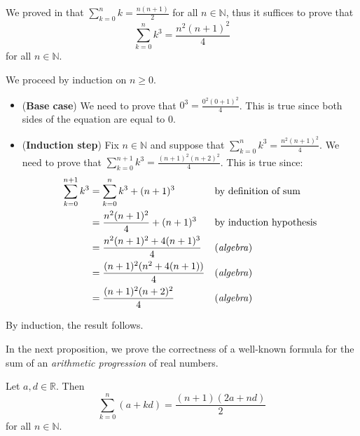 \begin{cproof}
We proved in  that $\displaystyle\sum_{k=0}^n k = \frac{n(n+1)}{2}$ for all $n \in \mathbb{N}$, thus it suffices to prove that
\[ \sum_{k=0}^n k^3 = \frac{n^2(n+1)^2}{4} \]
for all $n \in \mathbb{N}$.

We proceed by induction on $n \ge 0$.
\begin{itemize}
\item (\textbf{Base case}) We need to prove that $\displaystyle 0^3 = \frac{0^2(0+1)^2}{4}$. This is true since both sides of the equation are equal to $0$.
\item (\textbf{Induction step}) Fix $n \in \mathbb{N}$ and suppose that $\displaystyle \sum_{k=0}^n k^3 = \frac{n^2(n+1)^2}{4}$. We need to prove that $\displaystyle \sum_{k=0}^{n+1} k^3 = \frac{(n+1)^2(n+2)^2}{4}$. This is true since:
\begin{align*}
\sum_{k=0}^{n+1} k^3 & = \sum_{k=0}^n k^3 + (n+1)^3 && \text{by definition of sum} \\
&= \frac{n^2(n+1)^2}{4} + (n+1)^3 && \text{by induction hypothesis} \\
&= \frac{n^2(n+1)^2 + 4(n+1)^3}{4} && \text{(\textit{algebra})} \\
&= \frac{(n+1)^2(n^2 + 4(n+1))}{4} && \text{(\textit{algebra})} \\
&= \frac{(n+1)^2(n+2)^2}{4} && \text{(\textit{algebra})}
\end{align*}
\end{itemize}
By induction, the result follows.
\end{cproof}

In the next proposition, we prove the correctness of a well-known formula for the sum of an \textit{arithmetic progression} of real numbers.

\begin{proposition}
Let $a,d \in \mathbb{R}$. Then
\[ \sum_{k=0}^n (a+kd) = \frac{(n+1)(2a+nd)}{2} \]
for all $n \in \mathbb{N}$.
\end{proposition}

